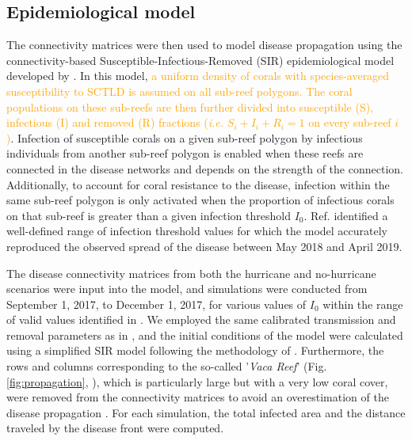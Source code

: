 \documentclass[fleqn,10pt]{wlscirep}
\newcommand{\modif}[1]{\textcolor{orange}{#1}}
\begin{document}
\subsection{Epidemiological model}
The connectivity matrices were then used to model disease propagation using the connectivity-based Susceptible-Infectious-Removed (SIR) epidemiological model developed by \citep{DobbySCTLD}. In this model, \modif{a uniform density of corals with species-averaged susceptibility to SCTLD is assumed on all sub-reef polygons. The coral populations on these sub-reefs are then further divided into susceptible (S), infectious (I) and removed (R) fractions (\textit{i.e.} $S_i+I_i+R_i = 1$ on every sub-reef $i$)}. Infection of susceptible corals on a given sub-reef polygon by infectious individuals from another sub-reef polygon is enabled when these reefs are connected in the disease networks and depends on the strength of the connection. Additionally, to account for coral resistance to the disease, infection within the same sub-reef polygon is only activated when the proportion of infectious corals on that sub-reef is greater than a given infection threshold $I_0$. Ref. \citep{DobbySCTLD} identified a well-defined range of infection threshold values for which the model accurately reproduced the observed spread of the disease between May 2018 and April 2019.

The disease connectivity matrices from both the hurricane and no-hurricane scenarios were input into the model, and simulations were conducted from September 1, 2017, to December 1, 2017, for various values of $I_0$ within the range of valid values identified in \citep{DobbySCTLD}. We employed the same calibrated transmission and removal parameters as in \citep{DobbySCTLD}, and the initial conditions of the model were calculated using a simplified SIR model following the methodology of \citep{DobbySCTLD}. Furthermore, the rows and columns corresponding to the so-called '\textit{Vaca Reef}' (Fig. \ref{fig:propagation}, \citealp{Frys2020}), which is particularly large but with a very low coral cover, were removed from the connectivity matrices to avoid an overestimation of the disease propagation \cite{DobbySCTLD}. For each simulation, the total infected area and the distance traveled by the disease front were computed.

\end{document}
